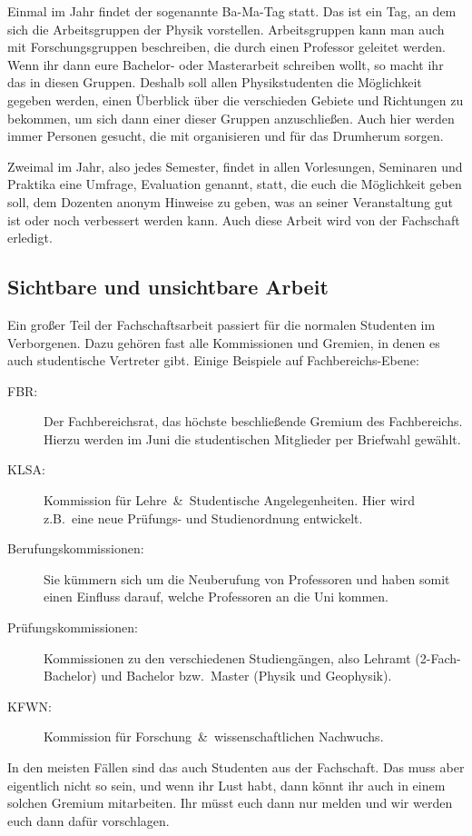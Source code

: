 \begin{multicols}{2}

Einmal im Jahr findet der sogenannte Ba-Ma-Tag statt. Das ist ein Tag, an dem sich die Arbeitsgruppen der Physik vorstellen. Arbeitsgruppen kann man auch mit Forschungsgruppen beschreiben, die durch einen Professor geleitet werden. Wenn ihr dann eure Bachelor- oder Masterarbeit schreiben wollt, so macht ihr das in diesen Gruppen. Deshalb soll allen Physikstudenten die Möglichkeit gegeben werden, einen Überblick über die verschieden Gebiete und Richtungen zu bekommen, um sich dann einer dieser Gruppen anzuschließen. Auch hier werden immer Personen gesucht, die mit organisieren und für das Drumherum sorgen.

Zweimal im Jahr, also jedes Semester, findet in allen Vorlesungen, Seminaren und Praktika eine Umfrage, Evaluation genannt, statt, die euch die Möglichkeit geben soll, dem Dozenten anonym Hinweise zu geben, was an seiner Veranstaltung gut ist oder noch verbessert werden kann. Auch diese Arbeit wird von der Fachschaft erledigt.

\subsection*{Sichtbare und unsichtbare Arbeit}
Ein großer Teil der Fachschaftsarbeit passiert für die normalen Studenten im Verborgenen. Dazu gehören fast alle Kommissionen und Gremien, in denen es auch studentische Vertreter gibt. Einige Beispiele auf Fachbereichs-Ebene:
\begin{description}
\item[FBR:] Der Fachbereichsrat, das höchste beschließende Gremium des Fachbereichs. Hierzu werden im Juni die studentischen Mitglieder per Briefwahl gewählt.
\item[KLSA:] Kommission für Lehre~\&~Studentische Angelegenheiten. Hier wird z.B.\ eine neue Prüfungs- und Studienordnung entwickelt.
\item[Berufungskommissionen:] Sie kümmern sich um die Neuberufung von Professoren und haben somit einen Einfluss darauf, welche Professoren an die Uni kommen.
\item[Prüfungskommissionen:] Kommissionen zu den verschiedenen Studiengängen, also Lehramt (2-Fach-Bachelor) und Bachelor bzw.\ Master (Physik und Geophysik).
\item[KFWN:] Kommission für Forschung~\&~wissenschaftlichen Nachwuchs.
\end{description}
In den meisten Fällen sind das auch Studenten aus der Fachschaft. Das muss aber eigentlich nicht so sein, und wenn ihr Lust habt, dann könnt ihr auch in einem solchen Gremium mitarbeiten. Ihr müsst euch dann nur melden und wir werden euch dann dafür vorschlagen.


\end{multicols}

